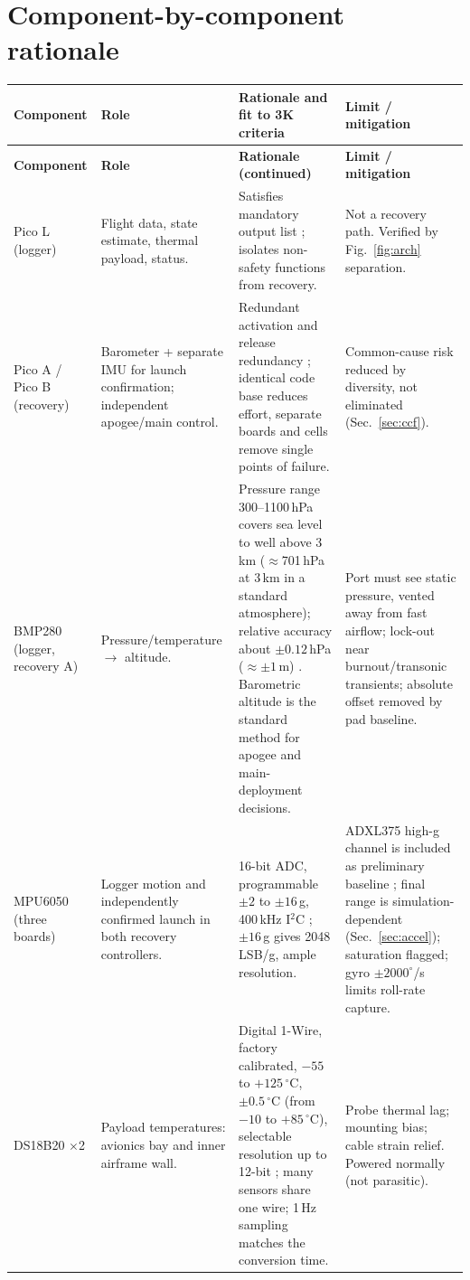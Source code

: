 \section{Component-by-component rationale}\label{sec:components}
\small
{}
\begin{longtable}{@{}L{23mm}L{30mm}L{60mm}L{37mm}@{}}
\toprule{}\textbf{Component}&\textbf{Role}&\textbf{Rationale and fit to 3K criteria}&\textbf{Limit / mitigation}\\\midrule\endfirsthead
\toprule{}\textbf{Component}&\textbf{Role}&\textbf{Rationale (continued)}&\textbf{Limit / mitigation}\\\midrule\endhead
\bottomrule\endlastfoot
Pico L (logger) & Flight data, state estimate, thermal payload, status. & Satisfies mandatory output list \cite{rtc2027app03}; isolates non-safety functions from recovery. & Not a recovery path. Verified by Fig.~\ref{fig:arch} separation.\\
Pico A / Pico B (recovery) & Barometer + separate IMU for launch confirmation; independent apogee/main control. & Redundant activation and release redundancy \cite{rtc2027app03}; identical code base reduces effort, separate boards and cells remove single points of failure. & Common-cause risk reduced by diversity, not eliminated (Sec.~\ref{sec:ccf}).\\
BMP280 (logger, recovery A) & Pressure/temperature $\rightarrow$ altitude. & Pressure range 300--1100\,hPa covers sea level to well above 3\,km ($\approx$701\,hPa at 3\,km in a standard atmosphere); relative accuracy about $\pm0.12$\,hPa ($\approx\pm1$\,m) \cite{bmp280ds}. Barometric altitude is the standard method for apogee and main-deployment decisions. & Port must see static pressure, vented away from fast airflow; lock-out near burnout/transonic transients; absolute offset removed by pad baseline.\\
MPU6050 (three boards) & Logger motion and independently confirmed launch in both recovery controllers. & 16-bit ADC, programmable $\pm2$ to $\pm16$\,g, 400\,kHz I$^2$C \cite{mpu6050ds,i2cspec}; $\pm16$\,g gives 2048\,LSB/g, ample resolution. & ADXL375 high-g channel is included as preliminary baseline \cite{adxl375ds}; final range is simulation-dependent (Sec.~\ref{sec:accel}); saturation flagged; gyro $\pm2000^{\circ}$/s limits roll-rate capture.\\
DS18B20 $\times$2 & Payload temperatures: avionics bay and inner airframe wall. & Digital 1-Wire, factory calibrated, $-55$ to $+125\,^{\circ}$C, $\pm0.5\,^{\circ}$C (from $-10$ to $+85\,^{\circ}$C), selectable resolution up to 12-bit \cite{ds18b20ds}; many sensors share one wire; 1\,Hz sampling matches the conversion time. & Probe thermal lag; mounting bias; cable strain relief. Powered normally (not parasitic).\\

\end{longtable}
